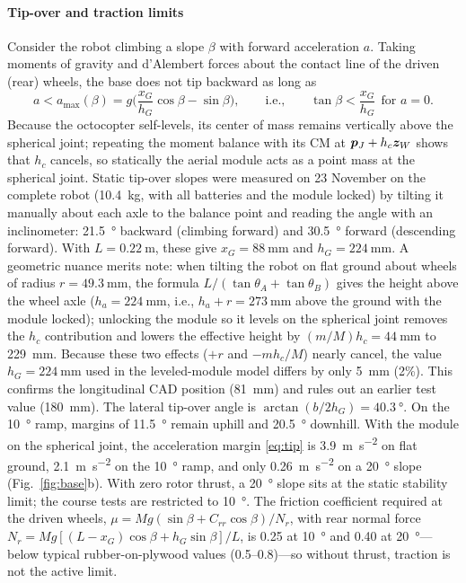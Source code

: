 \paragraph{Tip-over and traction limits}
Consider the robot climbing a slope $\beta$ with forward acceleration $a$. Taking moments of gravity and d'Alembert forces about the contact line of the driven (rear) wheels, the base does not tip backward as long as
\begin{equation}
  a< a_{\max}(\beta)=g\Big(\frac{x_G}{h_G}\cos\beta-\sin\beta\Big),\qquad\text{i.e.,}\qquad \tan\beta<\frac{x_G}{h_G}\ \ \text{for }a=0 .
  \label{eq:tip}
\end{equation}
Because the octocopter self-levels, its center of mass remains vertically above the spherical joint; repeating the moment balance with its CM at $\bm{p}_J+h_c\bm{z}_W$ shows that $h_c$ cancels, so statically the aerial module acts as a point mass at the spherical joint. Static tip-over slopes were measured on 23 November on the complete robot (\SI{10.4}{\kilo\gram}, with all batteries and the module locked) by tilting it manually about each axle to the balance point and reading the angle with an inclinometer: \SI{21.5}{\degree} backward (climbing forward) and \SI{30.5}{\degree} forward (descending forward). With $L=\SI{0.22}{\metre}$, these give $x_G=\SI{88}{\milli\metre}$ and $h_G=\SI{224}{\milli\metre}$. A geometric nuance merits note: when tilting the robot on flat ground about wheels of radius $r=\SI{49.3}{\milli\metre}$, the formula $L/(\tan\theta_A+\tan\theta_B)$ gives the height above the wheel axle ($h_a=\SI{224}{\milli\metre}$, i.e., $h_a+r=\SI{273}{\milli\metre}$ above the ground with the module locked); unlocking the module so it levels on the spherical joint removes the $h_c$ contribution and lowers the effective height by $(m/M)h_c=\SI{44}{\milli\metre}$ to \SI{229}{\milli\metre}. Because these two effects ($+r$ and $-mh_c/M$) nearly cancel, the value $h_G=\SI{224}{\milli\metre}$ used in the leveled-module model differs by only \SI{5}{\milli\metre} (2\%). This confirms the longitudinal CAD position (\SI{81}{\milli\metre}) and rules out an earlier test value (\SI{180}{\milli\metre}). The lateral tip-over angle is $\arctan(b/2h_G)=\SI{40.3}{\degree}$. On the \SI{10}{\degree} ramp, margins of \SI{11.5}{\degree} remain uphill and \SI{20.5}{\degree} downhill. With the module on the spherical joint, the acceleration margin \eqref{eq:tip} is \SI{3.9}{\metre\per\second\squared} on flat ground, \SI{2.1}{\metre\per\second\squared} on the \SI{10}{\degree} ramp, and only \SI{0.26}{\metre\per\second\squared} on a \SI{20}{\degree} slope (Fig.~\ref{fig:base}b). With zero rotor thrust, a \SI{20}{\degree} slope sits at the static stability limit; the course tests are restricted to \SI{10}{\degree}. The friction coefficient required at the driven wheels, $\mu=Mg(\sin\beta+C_{rr}\cos\beta)/N_r$, with rear normal force $N_r=Mg[(L-x_G)\cos\beta+h_G\sin\beta]/L$, is 0.25 at \SI{10}{\degree} and 0.40 at \SI{20}{\degree}---below typical rubber-on-plywood values (0.5--0.8)---so without thrust, traction is not the active limit.

